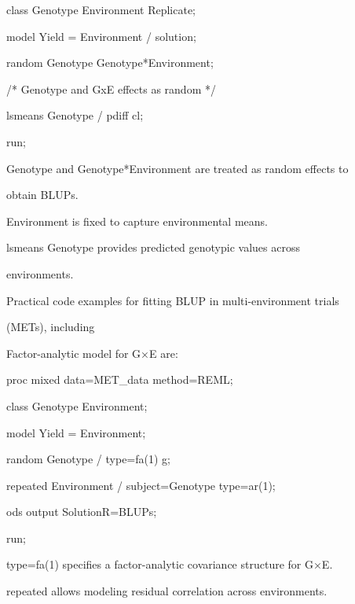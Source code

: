 \documentclass[10pt,twoside]{article}
\numberwithin{equation}{section}
\begin{document}
class Genotype Environment Replicate;



model Yield = Environment / solution;



random Genotype Genotype*Environment;



/* Genotype and GxE effects as random */



lsmeans Genotype / pdiff cl;



run;



Genotype and Genotype*Environment are treated as random effects to

obtain BLUPs.



Environment is fixed to capture environmental means.



lsmeans Genotype provides predicted genotypic values across

environments.



Practical code examples for fitting BLUP in multi-environment trials

(METs), including



Factor-analytic model for G×E are:



proc mixed data=MET\_data method=REML;



class Genotype Environment;



model Yield = Environment;



random Genotype / type=fa(1) g;



repeated Environment / subject=Genotype type=ar(1);



ods output SolutionR=BLUPs;



run;



type=fa(1) specifies a factor-analytic covariance structure for G×E.



repeated allows modeling residual correlation across environments.
\end{document}
